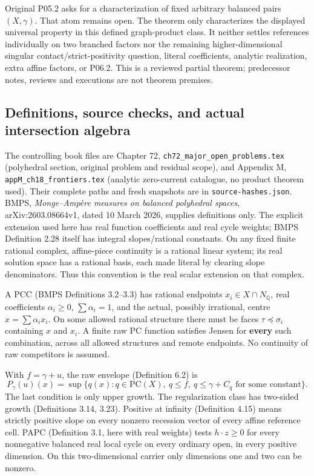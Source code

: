 \documentclass[
  11pt,
]{article}
\begin{document}
Original P05.2 asks for a characterization of fixed arbitrary balanced
pairs \((X,\gamma)\). That atom remains open. The theorem only
characterizes the displayed universal property in this defined
graph-product class. It neither settles references individually on two
branched factors nor the remaining higher-dimensional singular
contact/strict-positivity question, literal coefficients, analytic
realization, extra affine factors, or P06.2. This is a reviewed partial theorem;
predecessor notes, reviews and executions are not theorem premises.

\subsection{Definitions, source checks, and actual intersection
algebra}\label{definitions-source-checks-and-actual-intersection-algebra}

The controlling book files are Chapter 72,
\texttt{ch72\_major\_open\_problems.tex} (polyhedral section, original
problem and residual scope), and Appendix M,
\texttt{appM\_ch18\_frontiers.tex} (analytic zero-current catalogue, no
product theorem used). Their complete paths and fresh snapshots are in
\texttt{source-hashes.json}. BMPS, \emph{Monge--Ampère measures on
balanced polyhedral spaces}, arXiv:2603.08664v1, dated 10 March 2026,
supplies definitions only. The explicit extension used here has real
function coefficients and real cycle weights; BMPS Definition 2.28
itself has integral slopes/rational constants. On any fixed finite
rational complex, affine-piece continuity is a rational linear system;
its real solution space has a rational basis, each made literal by
clearing slope denominators. Thus this convention is the real scalar
extension on that complex.

A PCC (BMPS Definitions 3.2--3.3) has rational endpoints
\(x_i\in X\cap N_{\mathbb{Q}}\), real coefficients \(\alpha_i\geq0\),
\(\sum\alpha_i=1\), and the actual, possibly irrational, centre
\(x=\sum\alpha_i x_i\). On some allowed rational structure there must be
faces \(\tau\preceq\sigma_i\) containing \(x\) and \(x_i\). A finite raw
PC function satisfies Jensen for \textbf{every} such combination, across
all allowed structures and remote endpoints. No continuity of raw
competitors is assumed.

With \(f=\gamma+u\), the raw envelope (Definition 6.2) is \[
 P_\gamma(u)(x)=\sup\{q(x):q\in\mathrm{PC}(X),\ q\leq f,
                          \ q\leq\gamma+C_q\text{ for some constant}\}.
                                                               \tag{4}
\] The last condition is only upper growth. The regularization class has
two-sided growth (Definitions 3.14, 3.23). Positive at infinity
(Definition 4.15) means strictly positive slope on every nonzero
recession vector of every affine reference cell. PAPC (Definition 3.1,
here with real weights) tests \(h\cdot z\geq0\) for every nonnegative
balanced real local cycle on every ordinary open, in every positive
dimension. On this two-dimensional carrier only dimensions one and two
can be nonzero.
\end{document}
